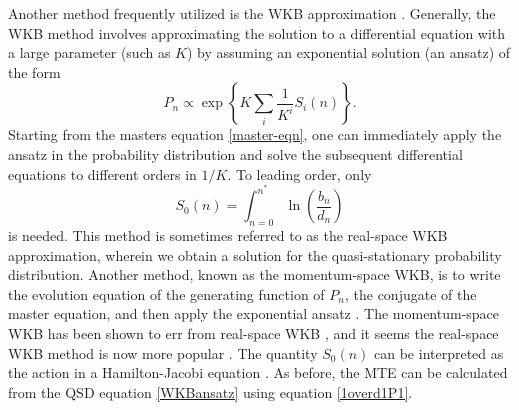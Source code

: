 Another method frequently utilized is the WKB approximation \cite{Doering2005,Assaf2006,Kessler2007,Kamenev2008,Assaf2010,Ovaskainen2010,Gottesman2012,Assaf2016,Yu2017}. 
Generally, the WKB method involves approximating the solution to a differential equation with a large parameter (such as $K$) by assuming an exponential solution (an ansatz) of the form \cite{Assaf2016}
\begin{equation}
P_n \propto \exp \left\{ K \sum_i \frac{1}{K^i}S_i(n) \right\}.
 \label{WKBansatz}
\end{equation}
Starting from the masters equation \ref{master-eqn}, one can immediately apply the ansatz in the probability distribution and solve the subsequent differential equations to different orders in $1/K$\cite{Assaf2016}.%
To leading order, only 
\begin{equation}
S_0(n) = \int_{n=0}^{n^*} \ln\left(\frac{b_n}{d_n}\right)
 \label{WKBaction}
\end{equation}
is needed. 
This method is sometimes referred to as the real-space WKB approximation, wherein we obtain a solution for the quasi-stationary probability distribution.
Another method, known as the momentum-space WKB, is to write the evolution equation of the generating function of $P_n$, the conjugate of the master equation, and then apply the exponential ansatz \cite{Assaf2006,Assaf2016}. 
The momentum-space WKB has been shown to err from real-space WKB \cite{Ovaskainen2010,Assaf2016}, and it seems the real-space WKB method is now more popular \cite{Kessler2007,Kamenev2008,Assaf2010,Ovaskainen2010,Gottesman2012,Assaf2016,Yu2017}. 
The quantity $S_0(n)$ can be interpreted as the action in a Hamilton-Jacobi equation \cite{Assaf2016}. 
As before, the MTE can be calculated from the QSD equation \ref{WKBansatz} using equation \ref{1overd1P1}. 

